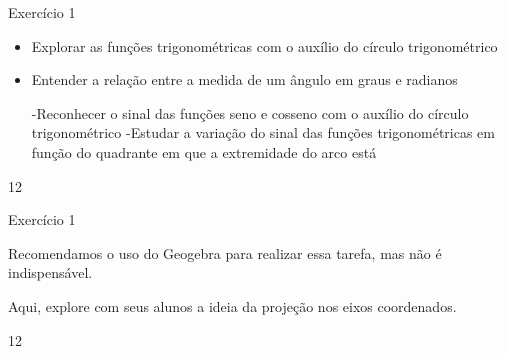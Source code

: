 \clearpage
\def\currentcolor{cor1}
\marginpar{\vspace{-.5em}}
\begin{objectives}{Exercício 1}
{
\begin{itemize}
\item Explorar as funções trigonométricas com o auxílio do círculo
trigonométrico
\item Entender a relação entre a medida de um ângulo em graus e
radianos

-Reconhecer o sinal das funções seno e cosseno com o auxílio
do círculo trigonométrico
-Estudar a variação do sinal das funções trigonométricas em
função do quadrante em que a extremidade do arco está
\end{itemize}
}{1}{2}
\end{objectives}
\marginpar{\vspace{-2.5em}}
\begin{sugestions}{Exercício 1}
{
Recomendamos o uso do Geogebra para realizar essa tarefa,
mas não é indispensável.


Aqui, explore com seus alunos a ideia da projeção nos eixos
coordenados.
}{1}{2}
\end{sugestions}
\marginpar{\vspace{-1.75em}}
